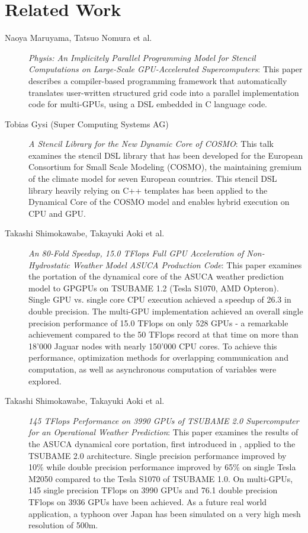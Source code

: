 \clearpage
\section{Related Work} \label{sec:relatedWork}

\begin{description}
 \item [Naoya Maruyama, Tatsuo Nomura et al.] \textit{Physis: An Implicitely Parallel Programming Model for Stencil Computations on Large-Scale GPU-Accelerated Supercomputers}: This paper describes a compiler-based programming framework that automatically translates user-written structured grid code into a parallel implementation code for multi-GPUs, using a DSL embedded in C language code.~\cite{Maruyama}
 
 \item [Tobias Gysi (Super Computing Systems AG)] \textit{A Stencil Library for the New Dynamic Core of COSMO}: This talk examines the stencil DSL library that has been developed for the European Consortium for Small Scale Modeling (COSMO), the maintaining gremium of the climate model for seven European countries. This stencil DSL library heavily relying on C++ templates has been applied to the Dynamical Core of the COSMO model and enables hybrid execution on CPU and GPU.~\cite{Gysi}
 
 \item [Takashi Shimokawabe, Takayuki Aoki et al.] \textit{An 80-Fold Speedup, 15.0 TFlops Full GPU Acceleration of Non-Hydrostatic Weather Model ASUCA Production Code}: This paper examines the portation of the dynamical core of the ASUCA weather prediction model to GPGPUs on TSUBAME 1.2 (Tesla S1070, AMD Opteron). Single GPU vs. single core CPU execution achieved a speedup of 26.3 in double precision. The multi-GPU implementation achieved an overall single precision performance of 15.0 TFlops on only 528 GPUs - a remarkable achievement compared to the 50 TFlops record at that time on more than 18'000 Jaguar nodes with nearly 150'000 CPU cores. To achieve this performance, optimization methods for overlapping communication and computation, as well as asynchronous computation of variables were explored.~\cite{Shimokawabe2010}
 
 \item [Takashi Shimokawabe, Takayuki Aoki et al.] \textit{145 TFlops Performance on 3990 GPUs of TSUBAME 2.0 Supercomputer for an Operational Weather Prediction}: This paper examines the results of the ASUCA dynamical core portation, first introduced in \cite{Shimokawabe2010}, applied to the TSUBAME 2.0 architecture. Single precision performance improved by 10\% while double precision performance improved by 65\% on single Tesla M2050 compared to the Tesla S1070 of TSUBAME 1.0. On multi-GPUs, 145 single precision TFlops on 3990 GPUs and 76.1 double precision TFlops on 3936 GPUs have been achieved. As a future real world application, a typhoon over Japan has been simulated on a very high mesh resolution of 500m.~\cite{Shimokawabe2011}
 

\end{description}
